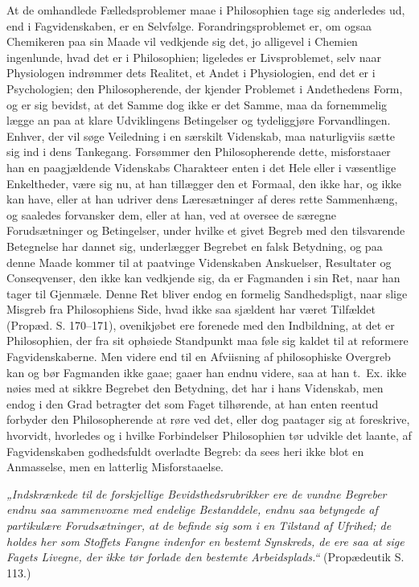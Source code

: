 \documentclass[12pt,a4paper]{book}
\begin{document}
At de omhandlede Fælledsproblemer maae i Philosophien tage sig
anderledes ud, end i Fagvidenskaben, er en Selvfølge.
Forandringsproblemet er, om ogsaa Chemikeren paa sin Maade vil
vedkjende sig det, jo alligevel i Chemien
ingenlunde, hvad det er i Philosophien; ligeledes er Livsproblemet,
selv naar Physiologen indrømmer dets Realitet, et Andet i
Physiologien, end det er i Psychologien; den Philosopherende, der
kjender Problemet i Andethedens Form, og er sig bevidst, at det Samme
dog ikke er det Samme, maa da fornemmelig lægge an paa at klare
Udviklingens Betingelser og tydeliggjøre Forvandlingen. Enhver, der
vil søge Veiledning i en særskilt Videnskab, maa naturligviis sætte
sig ind i dens Tankegang. Forsømmer den Philosopherende dette,
misforstaaer han en paagjældende Videnskabs Charakteer enten i det
Hele eller i væsentlige Enkeltheder, være sig nu, at han tillægger den
et Formaal, den ikke har, og ikke kan have, eller at han udriver dens
Læresætninger af deres rette Sammenhæng, og saaledes forvansker dem,
eller at han, ved at oversee de særegne Forudsætninger og Betingelser,
under hvilke et givet Begreb med den tilsvarende Betegnelse har dannet
sig, underlægger Begrebet en falsk Betydning, og paa denne Maade
kommer til at paatvinge Videnskaben Anskuelser, Resultater og
Conseqvenser, den ikke kan vedkjende sig, da er Fagmanden i sin Ret,
naar han tager til Gjenmæle. Denne Ret bliver endog en formelig
Sandhedspligt, naar slige Misgreb fra Philosophiens Side, hvad ikke
saa sjældent har været Tilfældet (Propæd. S. 170--171), ovenikjøbet
ere forenede med den Indbildning, at det er Philosophien, der fra sit
ophøiede Standpunkt maa føle sig kaldet til at reformere
Fagvidenskaberne. Men videre end til en Afviisning af philosophiske
Overgreb kan og bør Fagmanden ikke gaae; gaaer han endnu videre, saa
at han t.~Ex. ikke nøies med at sikkre Begrebet den Betydning, det har
i hans Videnskab, men endog i den Grad betragter det som Faget
tilhørende, at han enten reentud forbyder den Philosopherende at røre
ved det, eller dog paatager sig at foreskrive, hvorvidt, hvorledes og
i hvilke Forbindelser Philosophien tør udvikle det laante, af
Fagvidenskaben godhedsfuldt overladte Begreb: da sees heri ikke blot
en Anmasselse, men en latterlig Misforstaaelse.

\emph{„Indskrænkede til de forskjellige Bevidsthedsrubrikker ere de
vundne Begreber endnu saa sammenvoxne med endelige Bestanddele, endnu
saa betyngede af partikulære Forudsætninger, at de befinde sig som i
en Tilstand af Ufrihed; de holdes her som Stoffets Fangne indenfor en
bestemt Synskreds, de ere saa at sige Fagets Livegne, der ikke tør
forlade den bestemte Arbeidsplads.“} (Propædeutik S. 113.)
\end{document}
